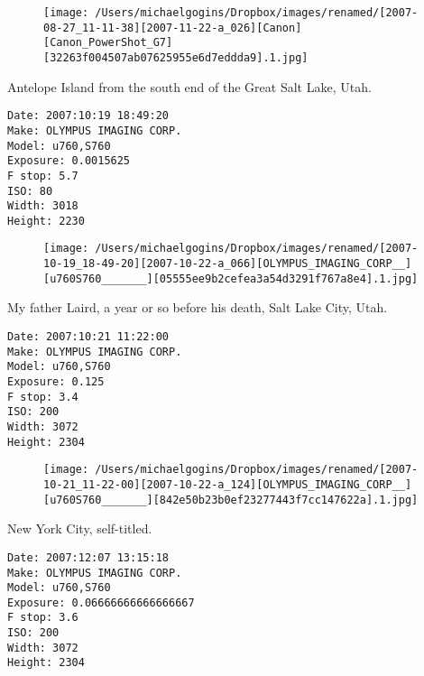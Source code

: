 \documentclass[11pt,letter,DIV=14,paper=landscape]{scrbook}
\begin{document}
\begin{figure}
\texttt{[image: /Users/michaelgogins/Dropbox/images/renamed/[2007-08-27\_11-11-38][2007-11-22-a\_026][Canon][Canon\_PowerShot\_G7][32263f004507ab07625955e6d7eddda9].1.jpg]}
\end{figure}
    
\clearpage
\noindent Antelope Island from the south end of the Great Salt Lake, Utah.
\noindent
\begin{lstlisting}
Date: 2007:10:19 18:49:20
Make: OLYMPUS IMAGING CORP.  
Model: u760,S760       
Exposure: 0.0015625
F stop: 5.7
ISO: 80
Width: 3018
Height: 2230
\end{lstlisting}
\clearpage

\begin{figure}
\texttt{[image: /Users/michaelgogins/Dropbox/images/renamed/[2007-10-19\_18-49-20][2007-10-22-a\_066][OLYMPUS\_IMAGING\_CORP\_\_][u760S760\_\_\_\_\_\_\_][05555ee9b2cefea3a54d3291f767a8e4].1.jpg]}
\end{figure}
    
\clearpage
\noindent My father Laird, a year or so before his death, Salt Lake City, Utah.
\noindent
\begin{lstlisting}
Date: 2007:10:21 11:22:00
Make: OLYMPUS IMAGING CORP.  
Model: u760,S760       
Exposure: 0.125
F stop: 3.4
ISO: 200
Width: 3072
Height: 2304
\end{lstlisting}
\clearpage

\begin{figure}
\texttt{[image: /Users/michaelgogins/Dropbox/images/renamed/[2007-10-21\_11-22-00][2007-10-22-a\_124][OLYMPUS\_IMAGING\_CORP\_\_][u760S760\_\_\_\_\_\_\_][842e50b23b0ef23277443f7cc147622a].1.jpg]}
\end{figure}
    
\clearpage
\noindent New York City, self-titled.
\noindent
\begin{lstlisting}
Date: 2007:12:07 13:15:18
Make: OLYMPUS IMAGING CORP.  
Model: u760,S760       
Exposure: 0.06666666666666667
F stop: 3.6
ISO: 200
Width: 3072
Height: 2304
\end{lstlisting}
\clearpage
\end{document}
